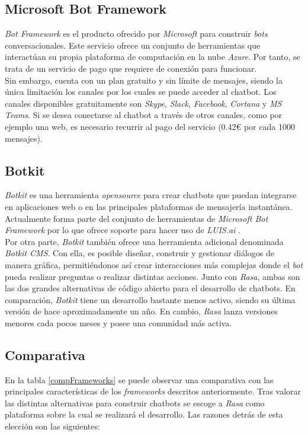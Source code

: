 \subsection{Microsoft Bot Framework}
\textit{Bot Framework} es el producto ofrecido por \textit{Microsoft} para construir \textit{bots} conversacionales. Este servicio ofrece un conjunto de herramientas que interactúan su propia plataforma de computación en la nube \textit{Azure}. Por tanto, se trata de un servicio de pago que requiere de conexión para funcionar.\\

Sin embargo, cuenta con un plan gratuito y sin límite de mensajes, siendo la única limitación los canales por los cuales se puede acceder al chatbot. Los canales disponibles gratuitamente son \textit{Skype}, \textit{Slack}, \textit{Facebook}, \textit{Cortana} y \textit{MS Teams}. Si se desea conectarse al chatbot a través de otros canales, como por ejemplo una web, es necesario recurrir al pago del servicio (0.42\euro{} por cada 1000 mensajes).\\

\subsection{Botkit}
\textit{Botkit} \cite{botkit} es una herramienta \textit{opensource} para crear chatbots que puedan integrarse en aplicaciones web o en las principales plataformas de mensajería instantánea. Actualmente forma parte del conjunto de herramientas de \textit{Microsoft Bot Framework} por lo que ofrece soporte para hacer uso de \textit{LUIS.ai} \cite{luis}.\\

Por otra parte, \textit{Botkit} también ofrece una herramienta adicional denominada \textit{Botkit CMS}. Con ella, es posible diseñar, construir y gestionar diálogos de manera gráfica, permitiéndonos así crear interacciones más complejas donde el \textit{bot} pueda realizar preguntas o realizar distintas acciones. Junto con \textit{Rasa}, ambas son las dos grandes alternativas de código abierto para el desarrollo de chatbots. En comparación, \textit{Botkit} tiene un desarrollo bastante menos activo, siendo su última versión de hace aproximadamente un año. En cambio, \textit{Rasa} lanza versiones menores cada pocos meses y posee una comunidad más activa.\\


\subsection{Comparativa}
En la tabla \ref{compFrameworks} se puede observar una comparativa con las principales características de los \textit{frameworks} descritos anteriormente. Tras valorar las distintas alternativas para construir chatbots se escoge a \textit{Rasa} como plataforma sobre la cual se realizará el desarrollo. Las razones detrás de esta elección son las siguientes:\\ 

